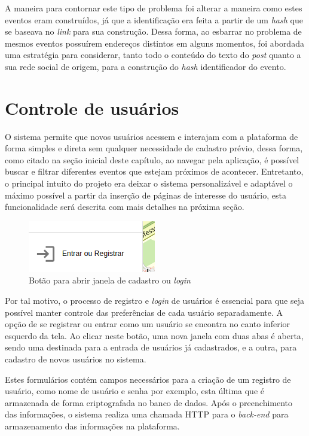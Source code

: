 A maneira para contornar este tipo de problema foi alterar a maneira como estes
eventos eram construídos, já que a identificação era feita a partir de um
\textit{hash} que se baseava no \textit{link} para sua construção. Dessa forma,
ao esbarrar no problema de mesmos eventos possuírem endereços distintos em
alguns momentos, foi abordada uma estratégia para considerar, tanto todo o
conteúdo do texto do \textit{post} quanto a sua rede social de origem, para a
construção do \textit{hash} identificador do evento.

\section{Controle de usuários}

O sistema permite que novos usuários acessem e interajam com a plataforma de
forma simples e direta sem qualquer necessidade de cadastro prévio, dessa
forma, como citado na seção inicial deste capítulo, ao navegar pela aplicação,
é possível buscar e filtrar diferentes eventos que estejam próximos de
acontecer. Entretanto, o principal intuito do projeto era deixar o sistema
personalizável e adaptável o máximo possível a partir da inserção de páginas de
interesse do usuário, esta funcionalidade será descrita com mais detalhes na
próxima seção.

\begin{figure}[h]
    \centering
    \includegraphics[scale=.8]{figuras/loginButton.png}
    \caption{Botão para abrir janela de cadastro ou \textit{login}}
    \label{fig:enter-label}
\end{figure}

Por tal motivo, o processo de registro e \textit{login} de usuários é essencial
para que seja possível manter controle das preferências de cada usuário
separadamente. A opção de se registrar ou entrar como um usuário se encontra no
canto inferior esquerdo da tela. Ao clicar neste botão, uma nova janela com
duas abas é aberta, sendo uma destinada para a entrada de usuários já
cadastrados, e a outra, para cadastro de novos usuários no sistema.

Estes formulários contém campos necessários para a criação de um registro de
usuário, como nome de usuário e senha por exemplo, esta última que é armazenada
de forma criptografada no banco de dados. Após o preenchimento das informações,
o sistema realiza uma chamada \acs{HTTP} para o \textit{back-end} para
armazenamento das informações na plataforma.

